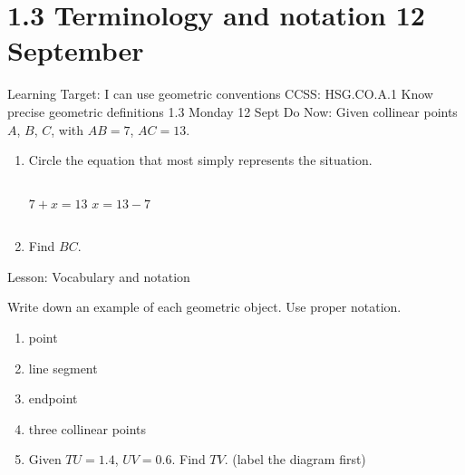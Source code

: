 \section{1.3 Terminology and notation \hfill 12 September}
\begin{frame}{Learning Target: I can use geometric conventions}
  {CCSS: HSG.CO.A.1 Know precise geometric definitions \hfill \alert{1.3 Monday 12 Sept}}
  Do Now: Given collinear points $A$, $B$, $C$, with $AB=7$, $AC=13$.
  \begin{center}
  \end{center}
  \begin{enumerate}
    \item Circle the equation that most simply represents the situation. \medskip
    \begin{columns}[c]
      \qquad \hspace{2cm} $7 + x = 13$
      $x = 13 - 7$
    \end{columns}
    \item Find $BC$.
  \end{enumerate} \vspace{2cm}
  Lesson: Vocabulary and notation
  \end{frame}

\begin{frame}{Write down an example of each geometric object.}
{Use proper notation.}
  \begin{enumerate}
    \item point
    \item line segment
    \item endpoint
    \item three collinear points
    \item Given $TU=1.4$, $UV=0.6$. Find $TV$. (label the diagram first)
  \end{enumerate}
  \end{frame}

